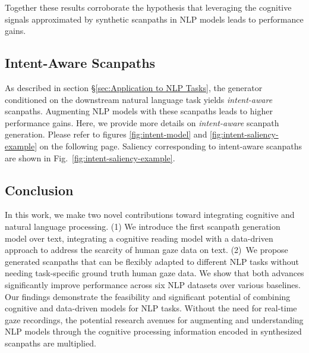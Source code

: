 Together these results corroborate the hypothesis that leveraging the cognitive signals approximated by synthetic scanpaths in NLP models leads to performance gains.



\subsection{Intent-Aware Scanpaths}
\label{sec:appendix_intent_aware_scanpaths}
As described in section \S\ref{sec:Application to NLP Tasks}, the generator conditioned on the downstream natural language task yields \textit{intent-aware} scanpaths. Augmenting NLP models with these scanpaths leads to higher performance gains. Here, we provide more details on \textit{intent-aware} scanpath generation.
Please refer to figures \ref{fig:intent-model} and \ref{fig:intent-saliency-example} on the following page. Saliency corresponding to intent-aware scanpaths are shown in Fig.~\ref{fig:intent-saliency-example}.




\subsection{Conclusion}
\label{sec:ConclusionFutureWork}
In this work, we make two novel contributions toward integrating cognitive and natural language processing. (1) We introduce the first scanpath generation model over text, integrating a cognitive reading model with a data-driven approach to address the scarcity of human gaze data on text. (2)~We propose generated scanpaths that can be flexibly adapted to different NLP tasks without needing task-specific ground truth human gaze data. We show that both advances significantly improve performance across six NLP datasets over various baselines. Our findings demonstrate the feasibility and significant potential of combining cognitive and data-driven models for NLP tasks. Without the need for real-time gaze recordings, the potential research avenues for augmenting and understanding NLP models through the cognitive processing information encoded in synthesized scanpaths are multiplied.





